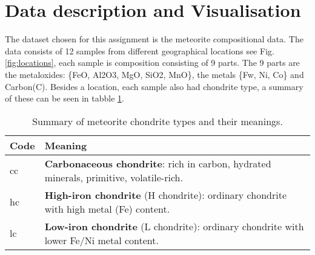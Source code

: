 \section{Data description and Visualisation}

The dataset chosen for this assignment is the meteorite compositional data. The data consists of 12 samples 
from different geographical locations see Fig. \ref{fig:locations}, each sample is composition consisting of 9 parts. The 9 parts are the metaloxides: \{FeO, Al2O3, MgO, SiO2, MnO\}, the metals \{Fw, Ni, Co\} and Carbon(C). Besides a location, each sample also had chondrite type, a summary of these can be seen in tabble \ref{tab:chondrite-types}.

\begin{table}[H]
\centering
\begin{tabular}{@{}ll@{}}
\toprule
\textbf{Code} & \textbf{Meaning} \\ \midrule
cc & \textbf{Carbonaceous chondrite}: rich in carbon, hydrated minerals, primitive, volatile-rich. \\
hc & \textbf{High-iron chondrite} (H chondrite): ordinary chondrite with high metal (Fe) content. \\
lc & \textbf{Low-iron chondrite} (L chondrite): ordinary chondrite with lower Fe/Ni metal content. \\ \bottomrule
\end{tabular}
\caption{Summary of meteorite chondrite types and their meanings.}
\label{tab:chondrite-types}
\end{table}












